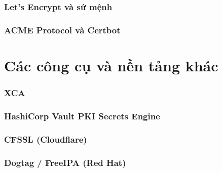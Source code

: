 \subsubsection*{Let's Encrypt và sứ mệnh}

\subsubsection*{ACME Protocol và Certbot}

\section{Các công cụ và nền tảng khác}
\label{sec:6.4}

\subsubsection*{XCA}

\subsubsection*{HashiCorp Vault PKI Secrets Engine}

\subsubsection*{CFSSL (Cloudflare)}

\subsubsection*{Dogtag / FreeIPA (Red Hat)}


